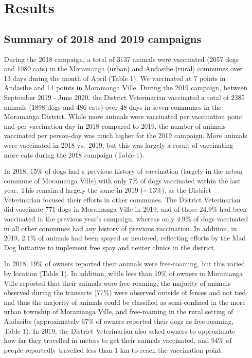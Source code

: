 \documentclass[tropicalmed,article,submit,moreauthors,pdftex]{mdpi}
\begin{document}
\hypertarget{results}{%
\section{Results}\label{results}}

\hypertarget{summary-of-2018-and-2019-campaigns}{%
\subsection{Summary of 2018 and 2019
campaigns}\label{summary-of-2018-and-2019-campaigns}}

During the 2018 campaign, a total of 3137 animals were vaccinated (2057
dogs and 1080 cats) in the Moramanga (urban) and Andasibe (rural)
communes over 13 days during the month of April (Table 1). We vaccinated
at 7 points in Andasibe and 14 points in Moramanga Ville. During the
2019 campaign, between September 2019 - June 2020, the District
Veterinarian vaccinated a total of 2385 animals (1898 dogs and 486 cats)
over 48 days in seven communes in the Moramanga District. While more
animals were vaccinated per vaccination point and per vaccination day in
2018 compared to 2019, the number of animals vaccinated per person-day
was much higher for the 2019 campaign. More animals were vaccinated in
2018 vs.~2019, but this was largely a result of vaccinating more cats
during the 2018 campaign (Table 1).

In 2018, 15\% of dogs had a previous history of vaccination (largely in
the urban commune of Moramanga Ville) with only 7\% of dogs vaccinated
within the last year. This remained largely the same in 2019
(\textasciitilde{} 13\%), as the District Veterinarian focused their
efforts in other communes. The District Veterinarian did vaccinate 771
dogs in Moramanga Ville in 2019, and of those 24.9\% had been vaccinated
in the previous year's campaign, whereas only 4.9\% of dogs vaccinated
in all other communes had any history of previous vaccination. In
addition, in 2019, 2.1\% of animals had been spayed or neutered,
reflecting efforts by the Mad Dog Initiative to implement free spay and
neuter clinics in the district.

In 2018, 19\% of owners reported their animals were free-roaming, but
this varied by location (Table 1). In addition, while less than 19\% of
owners in Moramanga Ville reported that their animals were free roaming,
the majority of animals observed during the transects (77\%) were
observed outside of fences and not tied, and thus the majority of
animals could be classified as semi-confined in the more urban township
of Moramanga Ville, and free-roaming in the rural setting of Andasibe
(approximately 67\% of owners reported their dogs as free-roaming, Table
1). In 2019, the District Veterinarian also asked owners to approximate
how far they travelled in meters to get their animals vaccinated, and
94\% of people reportedly travelled less than 1 km to reach the
vaccination point.
\end{document}
